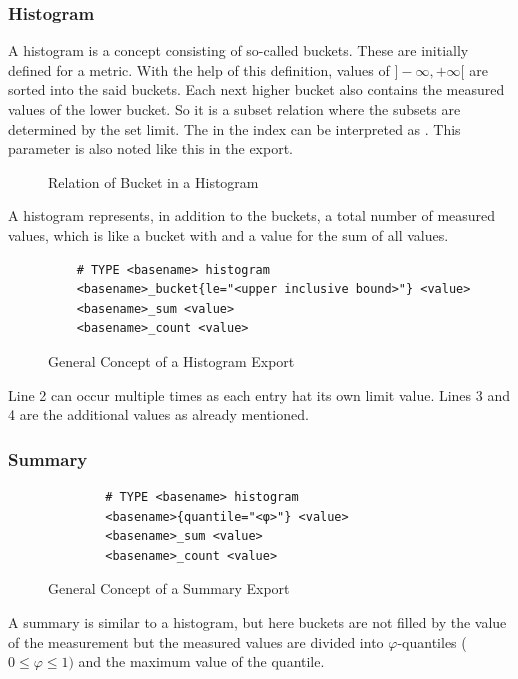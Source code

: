 \subsubsection{Histogram}
A histogram is a concept consisting of so-called buckets. These are initially defined for a metric. With the help of this definition, values of $]-\infty,+\infty[$ are sorted into the said buckets. Each next higher bucket also contains the measured values of the lower bucket. So it is a subset relation where the subsets are determined by the set limit. The  in the index can be interpreted as . This parameter is also noted like this in the export.
\begin{figure}[htp!]
	\caption{Relation of Bucket in a Histogram}
\end{figure}
A histogram represents, in addition to the buckets, a total number of measured values, which is like a bucket with  and a value for the sum of all values.
\begin{figure}[hbt!]
	\begin{verbatim}
	# TYPE <basename> histogram
	<basename>_bucket{le="<upper inclusive bound>"} <value>
	<basename>_sum <value>
	<basename>_count <value>
	\end{verbatim}
	\caption{General Concept of a Histogram Export}
\end{figure}
Line 2 can occur multiple times as each entry hat its own limit value. Lines 3 and 4 are the additional values as already mentioned.
\subsubsection{Summary}
\begin{figure}[h!]
	\begin{verbatim}
		# TYPE <basename> histogram
		<basename>{quantile="<φ>"} <value>
		<basename>_sum <value>
		<basename>_count <value>
	\end{verbatim}
	\caption{General Concept of a Summary Export}
\end{figure}
A summary is similar to a histogram, but here buckets are not filled by the value of the measurement but the measured values are divided into $\varphi$-quantiles ($0 \le \varphi \le 1)$ and the maximum value of the quantile.
